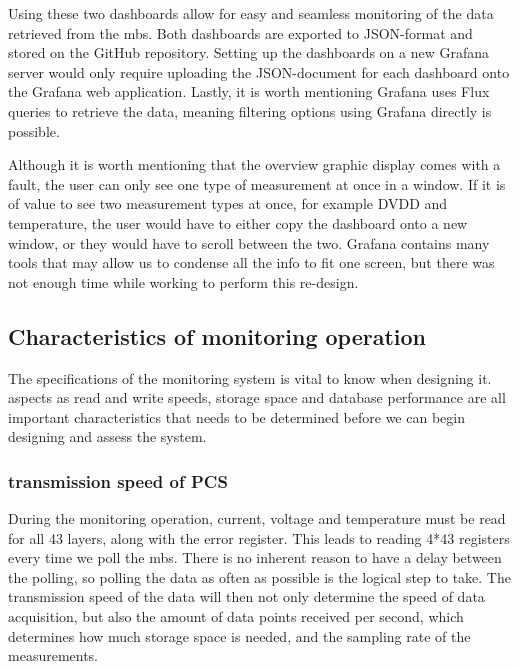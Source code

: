 \documentclass[main.tex]{subfiles}
\begin{document}
Using these two dashboards allow for easy and seamless monitoring of the data retrieved from the \gls{mb}s. Both dashboards are exported to JSON-format and stored on the GitHub repository. Setting up the dashboards on a new Grafana server would only require uploading the JSON-document for each dashboard onto the Grafana web application. Lastly, it is worth mentioning Grafana uses Flux queries to retrieve the data, meaning filtering options using Grafana directly is possible.

Although it is worth mentioning that the overview graphic display comes with a fault, the user can only see one type of measurement at once in a window. If it is of value to see two measurement types at once, for example DVDD and temperature, the user would have to either copy the dashboard onto a new window, or they would have to scroll between the two. Grafana contains many tools that may allow us to condense all the info to fit one screen, but there was not enough time while working to perform this re-design.


\subsection{Characteristics of monitoring operation}
\label{ssec: char_mon}
The specifications of the monitoring system is vital to know when designing it. aspects as read and write speeds, storage space and database performance are all important characteristics that needs to be determined before we can begin designing and assess the system.

\subsubsection{transmission speed of PCS}
During the monitoring operation, current, voltage and temperature must be read for all 43 layers, along with the error register. This leads to reading 4*43 registers every time we poll the \gls{mb}s. There is no inherent reason to have a delay between the polling, so polling the data as often as possible is the logical step to take. The transmission speed of the data will then not only determine the speed of data acquisition, but also the amount of data points received per second, which determines how much storage space is needed, and the sampling rate of the measurements.
\end{document}
